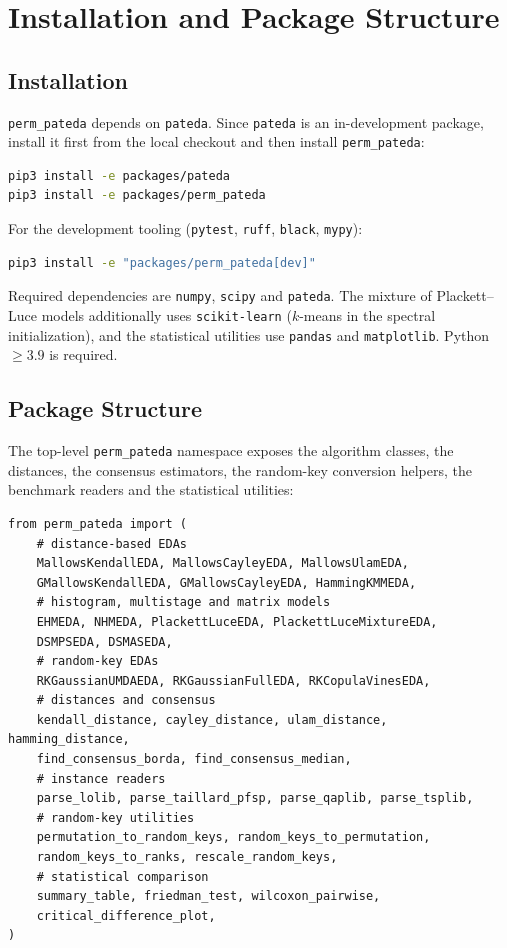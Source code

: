 \documentclass[a4paper,11pt]{article}
\begin{document}
\section{Installation and Package Structure}
\label{sec:install}

\subsection{Installation}

\texttt{perm\_pateda} depends on \texttt{pateda}.  Since \texttt{pateda} is an
in-development package, install it first from the local checkout and then install
\texttt{perm\_pateda}:

\begin{lstlisting}[language=bash]
pip3 install -e packages/pateda
pip3 install -e packages/perm_pateda
\end{lstlisting}

\noindent For the development tooling (\texttt{pytest}, \texttt{ruff},
\texttt{black}, \texttt{mypy}):

\begin{lstlisting}[language=bash]
pip3 install -e "packages/perm_pateda[dev]"
\end{lstlisting}

Required dependencies are \texttt{numpy}, \texttt{scipy} and \texttt{pateda}.
The mixture of Plackett--Luce models additionally uses
\texttt{scikit-learn} ($k$-means in the spectral initialization), and the
statistical utilities use \texttt{pandas} and \texttt{matplotlib}.  Python
$\geq 3.9$ is required.

\subsection{Package Structure}

The top-level \texttt{perm\_pateda} namespace exposes the algorithm classes, the
distances, the consensus estimators, the random-key conversion helpers, the
benchmark readers and the statistical utilities:

\begin{lstlisting}
from perm_pateda import (
    # distance-based EDAs
    MallowsKendallEDA, MallowsCayleyEDA, MallowsUlamEDA,
    GMallowsKendallEDA, GMallowsCayleyEDA, HammingKMMEDA,
    # histogram, multistage and matrix models
    EHMEDA, NHMEDA, PlackettLuceEDA, PlackettLuceMixtureEDA,
    DSMPSEDA, DSMASEDA,
    # random-key EDAs
    RKGaussianUMDAEDA, RKGaussianFullEDA, RKCopulaVinesEDA,
    # distances and consensus
    kendall_distance, cayley_distance, ulam_distance, hamming_distance,
    find_consensus_borda, find_consensus_median,
    # instance readers
    parse_lolib, parse_taillard_pfsp, parse_qaplib, parse_tsplib,
    # random-key utilities
    permutation_to_random_keys, random_keys_to_permutation,
    random_keys_to_ranks, rescale_random_keys,
    # statistical comparison
    summary_table, friedman_test, wilcoxon_pairwise,
    critical_difference_plot,
)
\end{lstlisting}
\end{document}
